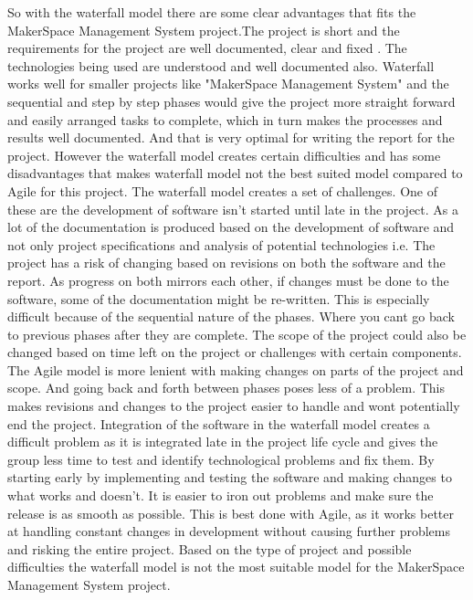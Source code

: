 So with the waterfall model there are some clear advantages that fits the MakerSpace Management System project.The project is short and the requirements for the project are well documented, clear and fixed . The technologies being used are understood and well documented also. Waterfall works well for smaller projects like "MakerSpace Management System" and the sequential and step by step phases would give the project more straight forward and easily arranged tasks to complete, which in turn makes the processes and results well documented. And that is very optimal for writing the report for the project. However the waterfall model creates certain difficulties and has some disadvantages that makes waterfall model not the best suited model compared to Agile for this project\cite{seguetech_waterfall_vs_agile}. 
The waterfall model creates a set of challenges. One of these are the development of software isn't started until late in the project. As a lot of the documentation is produced based on the development of software and not only project specifications and analysis of potential technologies i.e. The project has a risk of changing based on revisions on both the software and the report. As progress on both mirrors each other, if changes must be done to the software, some of the documentation might be re-written. This is especially difficult because of the sequential nature of the phases. Where you cant go back to previous phases after they are complete. The scope of the project could also be changed based on time left on the project or challenges with certain components. The Agile model is more lenient with making changes on parts of the project and scope. And going back and forth between phases poses less of a problem. This makes revisions and changes to the project easier to handle and wont potentially end the project. Integration of the software in the waterfall model creates a difficult problem as it is integrated late in the project life cycle and gives the group less time to test and identify technological problems and fix them\cite{Waterfall_Model:_What_is_it}. By starting early by implementing and testing the software and making changes to what works and doesn't. It is easier to iron out problems and make sure the release is as smooth as possible. This is best done with Agile, as it works better at handling constant changes in development without causing further problems and risking the entire project. Based on the type of project and possible difficulties the waterfall model is not the most suitable model for the MakerSpace Management System project.

